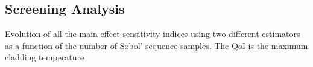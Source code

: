 \subsection{Screening Analysis}\label{sub:sa_application_screening_analysis}




{Evolution of all the main-effect sensitivity indices using two different estimators as a function of the number of Sobol' sequence samples.
The QoI is the maximum cladding temperature}